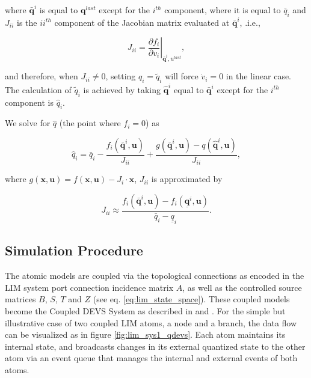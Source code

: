\noindent where $\bar{\mathbf{q}}^i$ is equal to $\mathbf{q}^{last}$ except for the $i^{th}$ component, where it is equal to $\bar{q}_i$ and $J_{ii}$ is the $ii^{th}$ component of the Jacobian matrix evaluated at $\bar{\mathbf{q}}^i$, .i.e.,

\begin{equation}
    \label{eq:liqss_qtilde2}  
    J_{ii} = \left. \frac{\partial f_i}{\partial v_i} \right|_{\bar{\mathbf{q}}^i, u^{last}},
\end{equation}

\noindent and therefore, when $J_{ii} \ne 0$, setting $q_i = \tilde{q}_i$ will force $\dot{v}_i=0$ in the linear case. The calculation of $\tilde{q}_i$ is achieved by taking $\hat{\mathbf{q}}^i$ equal to $\bar{\mathbf{q}}^i$ except for the $i^{th}$ component is $\hat{q}_i$.

We solve for $\hat{q}$ (the point where $f_i=0$) as 

\begin{equation}
    \label{eq:liqss_qhat3}  
    \hat{q}_i = \bar{q}_i - \frac{f_i \left( \bar{\mathbf{q}}^i, \mathbf{u} \right) }{J_{ii}} + \frac{g \left( \bar{\mathbf{q}}^i, \mathbf{u} \right) - q \left( \hat{\mathbf{q}}^i, \mathbf{u} \right) }{J_{ii}},
\end{equation}

where $g(\mathbf{x}, \mathbf{u}) = f(\mathbf{x}, \mathbf{u}) - J_i \cdot \mathbf{x}$, $J_{ii}$ is approximated by

\begin{equation}
    \label{eq:liqss_Jii}
    J_{ii} \approx \frac{f_i \left( \bar{\mathbf{q}}^i, \mathbf{u} \right) - f_i \left( \underline{\mathbf{q}}^i, \mathbf{u} \right) }{\bar{q}_i - \underline{q}_i}.
\end{equation}

\subsection{Simulation Procedure} 

The atomic models are coupled via the topological connections as encoded in the LIM system port connection incidence matrix $A$, as well as the controlled source matrices $B$, $S$, $T$ and $Z$ (see eq. \ref{eq:lim_state_space}). These coupled models become the Coupled DEVS System as described in \cite{zeigler1999} and \cite{kofman2004}. For the simple but illustrative case of two coupled LIM atoms, a node and a branch, the data flow can be visualized as in figure \ref{fig:lim_sys1_qdevs}. Each atom maintains its internal state, and broadcasts changes in its external quantized state to the other atom via an event queue that manages the internal and external events of both atoms.

